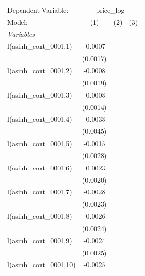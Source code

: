 
\begingroup
\centering
\begin{tabular}{lccc}
   \tabularnewline \midrule \midrule
   Dependent Variable: & \multicolumn{3}{c}{price\_log}\\
   Model:                           & (1)      & (2)                   & (3)\\  
   \midrule
   \emph{Variables}\\
   l(asinh\_cont\_0001,1)           & -0.0007  &                       &   \\   
                                    & (0.0017) &                       &   \\   
   l(asinh\_cont\_0001,2)           & -0.0008  &                       &   \\   
                                    & (0.0019) &                       &   \\   
   l(asinh\_cont\_0001,3)           & -0.0008  &                       &   \\   
                                    & (0.0014) &                       &   \\   
   l(asinh\_cont\_0001,4)           & -0.0038  &                       &   \\   
                                    & (0.0045) &                       &   \\   
   l(asinh\_cont\_0001,5)           & -0.0015  &                       &   \\   
                                    & (0.0028) &                       &   \\   
   l(asinh\_cont\_0001,6)           & -0.0023  &                       &   \\   
                                    & (0.0020) &                       &   \\   
   l(asinh\_cont\_0001,7)           & -0.0028  &                       &   \\   
                                    & (0.0023) &                       &   \\   
   l(asinh\_cont\_0001,8)           & -0.0026  &                       &   \\   
                                    & (0.0024) &                       &   \\   
   l(asinh\_cont\_0001,9)           & -0.0024  &                       &   \\   
                                    & (0.0025) &                       &   \\   
   l(asinh\_cont\_0001,10)          & -0.0025  &                       &   \\   

\end{tabular}
